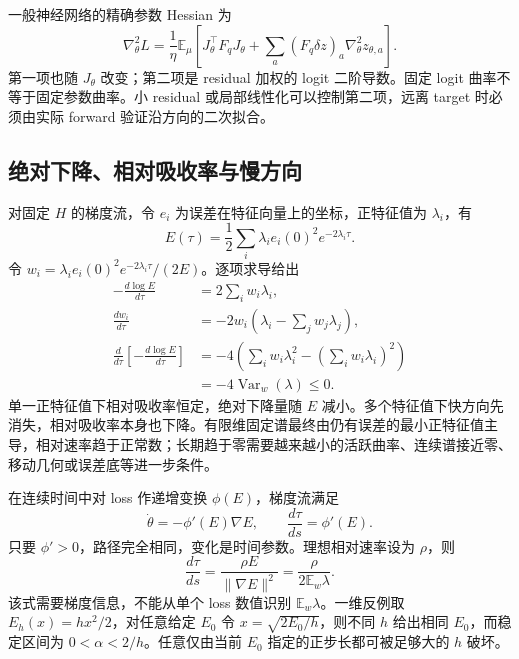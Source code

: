 \documentclass[lang=cn,scheme=chinese,openany]{../book/elegantbook}
\newcommand{\E}{\mathbb E}
\begin{document}
一般神经网络的精确参数 Hessian 为
\begin{equation}
\nabla_\theta^2L=
\frac1\eta\E_\mu\left[J_\theta^\top F_qJ_\theta+
\sum_a(F_q\delta z)_a\nabla_\theta^2z_{\theta,a}\right].
\end{equation}
第一项也随 $J_\theta$ 改变；第二项是 residual 加权的 logit 二阶导数。固定 logit 曲率不等于固定参数曲率。小 residual 或局部线性化可以控制第二项，远离 target 时必须由实际 forward 验证沿方向的二次拟合。

\subsection{绝对下降、相对吸收率与慢方向}

对固定 $H$ 的梯度流，令 $e_i$ 为误差在特征向量上的坐标，正特征值为 $\lambda_i$，有
\begin{equation}
E(\tau)=\frac12\sum_i\lambda_i e_i(0)^2e^{-2\lambda_i\tau}.
\end{equation}
令 $w_i=\lambda_i e_i(0)^2e^{-2\lambda_i\tau}/(2E)$。逐项求导给出
\begin{align}
-\frac{d\log E}{d\tau}&=2\sum_iw_i\lambda_i,\\
\frac{dw_i}{d\tau}&=-2w_i\left(\lambda_i-\sum_jw_j\lambda_j\right),\\
\frac{d}{d\tau}\left[-\frac{d\log E}{d\tau}\right]
&=-4\left(\sum_iw_i\lambda_i^2-\left(\sum_iw_i\lambda_i\right)^2\right)\\
&=-4\operatorname{Var}_w(\lambda)\le0.
\end{align}
单一正特征值下相对吸收率恒定，绝对下降量随 $E$ 减小。多个特征值下快方向先消失，相对吸收率本身也下降。有限维固定谱最终由仍有误差的最小正特征值主导，相对速率趋于正常数；长期趋于零需要越来越小的活跃曲率、连续谱接近零、移动几何或误差底等进一步条件。

在连续时间中对 loss 作递增变换 $\phi(E)$，梯度流满足
\begin{equation}
\dot\theta=-\phi'(E)\nabla E,\qquad
\frac{d\tau}{ds}=\phi'(E).
\end{equation}
只要 $\phi'>0$，路径完全相同，变化是时间参数。理想相对速率设为 $\rho$，则
\begin{equation}
\frac{d\tau}{ds}=\frac{\rho E}{\|\nabla E\|^2}
=\frac{\rho}{2\E_w\lambda}.
\end{equation}
该式需要梯度信息，不能从单个 loss 数值识别 $\E_w\lambda$。一维反例取 $E_h(x)=hx^2/2$，对任意给定 $E_0$ 令 $x=\sqrt{2E_0/h}$，则不同 $h$ 给出相同 $E_0$，而稳定区间为 $0<\alpha<2/h$。任意仅由当前 $E_0$ 指定的正步长都可被足够大的 $h$ 破坏。
\end{document}
